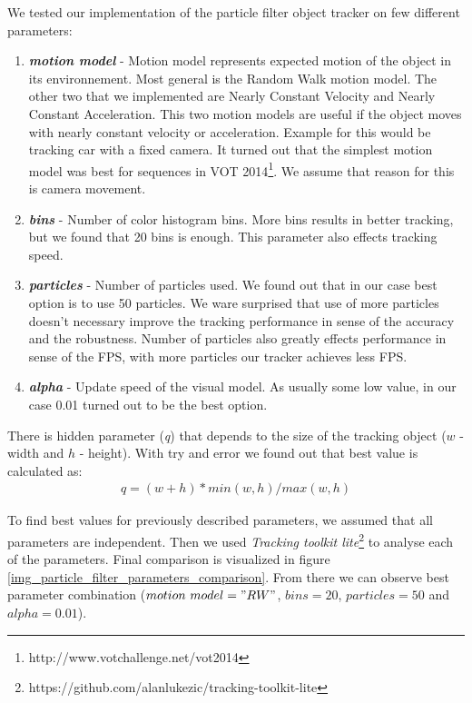 \documentclass[runningheads]{llncs}
\begin{document}
We tested our implementation of the particle filter object tracker on few different parameters:

\begin{enumerate}
    \item \textbf{\textit{motion model}} - Motion model represents expected motion of the object in its environnement. Most general is the Random Walk motion model. The other two that we implemented are Nearly Constant Velocity and Nearly Constant Acceleration. This two motion models are useful if the object moves with nearly constant velocity or acceleration. Example for this would be tracking car with a fixed camera. It turned out that the simplest motion model was best for sequences in VOT 2014\footnote{http://www.votchallenge.net/vot2014}. We assume that reason for this is camera movement.
    \item \textbf{\textit{bins}} - Number of color histogram bins. More bins results in better tracking, but we found that 20 bins is enough. This parameter also effects tracking speed.
    \item \textbf{\textit{particles}} - Number of particles used. We found out that in our case best option is to use 50 particles. We ware surprised that use of more particles doesn't necessary improve the tracking performance in sense of the accuracy and the robustness. Number of particles also greatly effects performance in sense of the FPS, with more particles our tracker achieves less FPS.
    \item \textbf{\textit{alpha}} - Update speed of the visual model. As usually some low value, in our case 0.01 turned out to be the best option.
\end{enumerate}

There is hidden parameter (\textit{q}) that depends to the size of the tracking object ($w$ - width and $h$ - height). With try and error we found out that best value is calculated as:
\begin{align}
    q = (w+h)*min(w, h)/max(w, h)
\end{align}

To find best values for previously described parameters, we assumed that all parameters are independent. Then we used \textit{Tracking toolkit lite}\footnote{https://github.com/alanlukezic/tracking-toolkit-lite} to analyse each of the parameters. Final comparison is visualized in figure \ref{img_particle_filter_parameters_comparison}. From there we can observe best parameter combination ($motion\ model = "RW"$, $bins = 20$, $particles = 50$ and $alpha = 0.01$).
\end{document}
